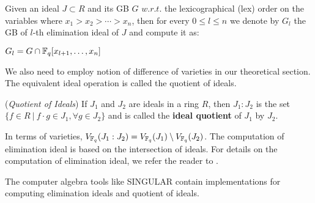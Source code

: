 \begin{Theorem}
\label{def:elim}
Given an ideal $J \subset R$ and its GB $G$ $w.r.t.$ the
lexicographical (lex) order on the variables 
where $x_1 > x_2 > \cdots > x_n$, then for every $0 \leq l \leq n$ we
denote by $G_l$ the GB of $l$-th elimination ideal of $J$ and compute it as:
\begin{center}
$G_l = G \cap {\mathbb{F}}_{q}[x_{l+1},\dots,x_n]$
\end{center}
\end{Theorem}

We also need to employ notion of difference of varieties in our theoretical
section. The equivalent ideal operation is called the quotient of ideals.

\begin{Definition}
\label{def:quo}
({\it Quotient of Ideals}) If $J_1$ and $J_2$ are ideals in a ring $R$,
then $J_1:J_2$ is the set 
  $\{f \in R \ |\ f\cdot g \in J_1, \forall g \in J_2\}$ %
and is called the {\bf ideal quotient} of $J_1$ by $J_2$.
\end{Definition}

In terms of varieties, $V_{{\mathbb{F}}_{q}}(J_1:J_2) = V_{{\mathbb{F}}_{q}}(J_1) \setminus V_{{\mathbb{F}}_{q}}(J_2)$.
The computation of elimination ideal is based on the intersection of ideals. 
For details on the computation of elimination ideal, we refer the reader to 
\cite{ideals:book}. 

\par The computer algebra tools like SINGULAR \cite{DGPS_410} contain implementations for 
computing elimination ideals and quotient of ideals.  
  